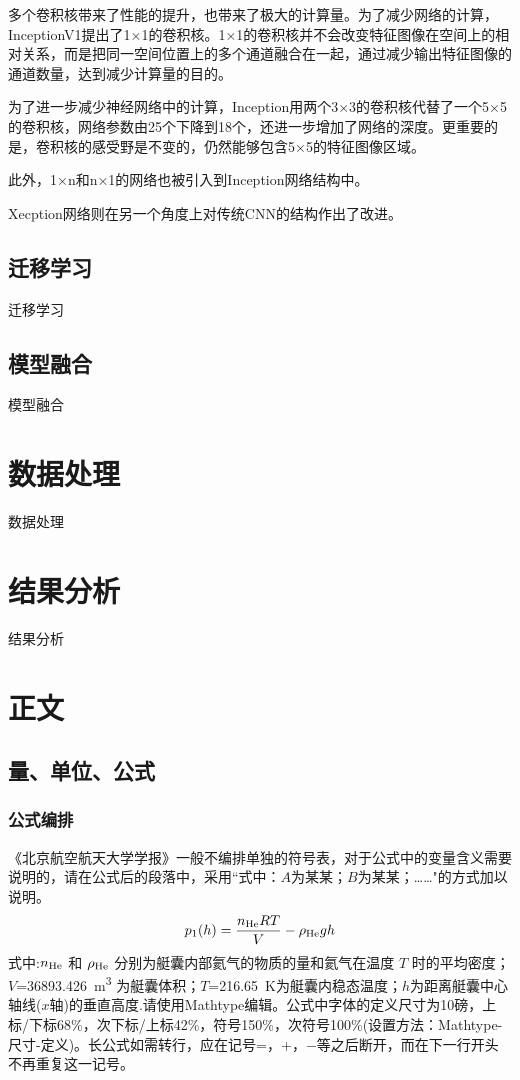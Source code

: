 \documentclass[10.5pt,twocolumn]{jbuaa}
\begin{document}
多个卷积核带来了性能的提升，也带来了极大的计算量。为了减少网络的计算，InceptionV1提出了1×1的卷积核。1×1的卷积核并不会改变特征图像在空间上的相对关系，而是把同一空间位置上的多个通道融合在一起，通过减少输出特征图像的通道数量，达到减少计算量的目的。

为了进一步减少神经网络中的计算，Inception用两个3×3的卷积核代替了一个5×5的卷积核，网络参数由25个下降到18个，还进一步增加了网络的深度。更重要的是，卷积核的感受野是不变的，仍然能够包含5×5的特征图像区域。

此外，1×n和n×1的网络也被引入到Inception网络结构中。

Xecption网络则在另一个角度上对传统CNN的结构作出了改进。
\subsection{迁移学习}
迁移学习
\subsection{模型融合}
模型融合

\section{数据处理}
数据处理

\section{结果分析}
结果分析

\section{正文}
\subsection{量、单位、公式}
\subsubsection{公式编排}
\label{labSecForm}
《北京航空航天大学学报》一般不编排单独的符号表，对于公式中的变量含义需要说明的，请在公式后的段落中，采用``式中：$A$为某某；$B$为某某；……"的方式加以说明。
\begin{equation}
\label{eqnLabelp}
p_1 (h) = \dfrac{n_{\textnormal{He}}RT}{V}-\rho_{\textnormal{He}}gh
\end{equation}
式中:$n_{\textnormal{He}}$ 和 $\rho_{\textnormal{He}}$ 分别为艇囊内部氦气的物质的量和氦气在温度 $T$ 时的平均密度；
$V$=\SI{36893.426}{\cubic\meter}%
为艇囊体积；$T$=\SI{216.65}{\kelvin}为艇囊内稳态温度；$h$为距离艇囊中心轴线($x$轴)的垂直高度.请使用Mathtype编辑。公式中字体的定义尺寸为10磅，上标/下标68\%，次下标/上标42\%，符号150\%，次符号100\%(设置方法：Mathtype-尺寸-定义)。长公式如需转行，应在记号=，+，$-$等之后断开，而在下一行开头不再重复这一记号。
\end{document}

